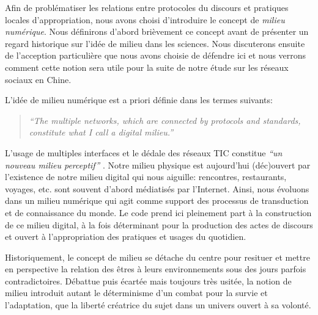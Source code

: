 Afin de problématiser les relations entre protocoles du discours et pratiques locales d’appropriation, nous avons choisi d’introduire le concept de \textit{milieu numérique}. Nous définirons d’abord brièvement ce concept avant de présenter un regard historique sur l’idée de milieu dans les sciences. Nous discuterons ensuite de l’acception particulière que nous avons choisie de défendre ici et nous verrons comment cette notion sera utile pour la suite de notre étude sur les réseaux sociaux en Chine.

L’idée de milieu numérique est a priori définie dans les termes suivants:

\begin{quote}
\textit{“The multiple networks, which are connected by protocols and standards, constitute what I call a digital milieu.”} \citep{Hui2012}
\end{quote}

L’usage de multiples interfaces et le dédale des réseaux TIC constitue \textit{“un nouveau milieu perceptif”} \citep{Barboza2006}. Notre milieu physique est aujourd’hui (déc)ouvert par l’existence de notre milieu digital qui nous aiguille: rencontres, restaurants, voyages, etc. sont souvent d'abord médiatisés par l’Internet. Ainsi, nous évoluons dans un milieu numérique qui agit comme support des processus de transduction et de connaissance du monde. Le code prend ici pleinement part à la construction de ce milieu digital, à la fois déterminant pour la production des actes de discours et ouvert à l’appropriation des pratiques et usages du quotidien.

Historiquement, le concept de milieu se détache du centre pour resituer et mettre en perspective la relation des êtres à leurs environnements sous des jours parfois contradictoires. Débattue puis écartée mais toujours très usitée, la notion de milieu introduit autant le déterminisme d’un combat pour la survie et l’adaptation, que la liberté créatrice du sujet dans un univers ouvert à sa volonté. 

